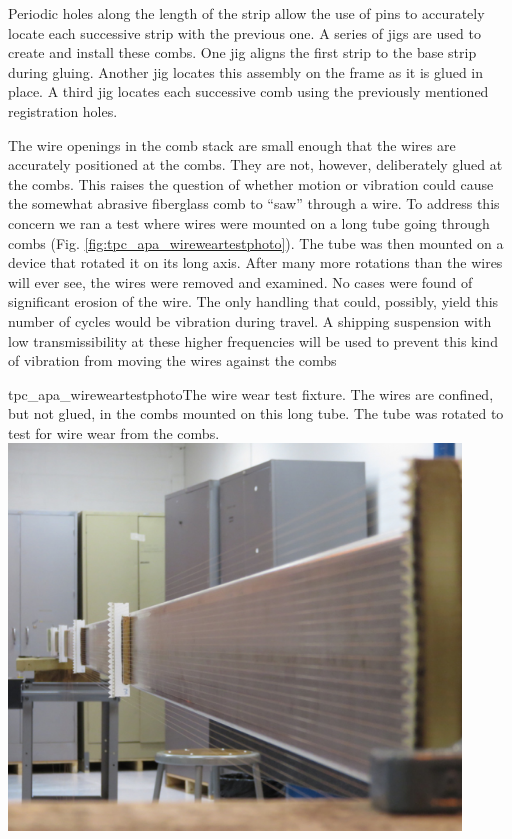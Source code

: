 Periodic holes along the length of the strip allow the use of pins to accurately locate each successive strip with the previous one.  A series of jigs are used to create and install these combs.  One jig aligns the first strip to the base strip during gluing.  Another jig locates this assembly on the frame as it is glued in place. A third jig locates each successive comb using the previously mentioned registration holes.

The wire openings in the comb stack are small enough that the wires are accurately positioned at the combs.  They are not, however, deliberately glued at the combs.  This raises the question of whether motion or vibration could cause the somewhat abrasive fiberglass comb to ``saw'' through a wire.  To address this concern we ran a test where wires were mounted on a long tube going through combs (Fig. \ref{fig:tpc_apa_wireweartestphoto}).  The tube was then mounted on a device that rotated it on its long axis.  After many more rotations than the wires will ever see, the wires were removed and examined.  No cases were found of significant erosion of the wire.  The only handling that could, possibly, yield this number of cycles would be vibration during travel.  A shipping suspension with low transmissibility at these higher frequencies will be used to prevent this kind of vibration from moving the wires against the combs

\begin{cdrfigure}{tpc_apa_wireweartestphoto}{The wire wear test fixture.  The wires are confined, but not glued, in the combs mounted on this long tube.  The tube was rotated to test for wire wear from the combs.}
\includegraphics[width=0.9\textwidth]{figures/tpc_apa_wireweartestphoto.png} 
\end{cdrfigure}


